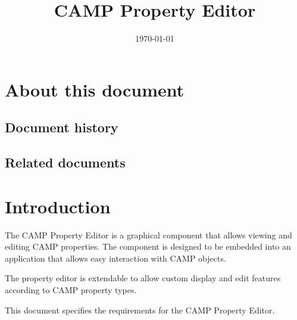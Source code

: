\documentclass[a4paper, twoside]{report}
\title{CAMP Property Editor}
\date{\today}
\begin{document}
\maketitle

\chapter*{About this document}

\section*{Document history}

\begin{historytable}
\end{historytable}

\section*{Related documents}

\begin{documenttable}
\end{documenttable}

\tableofcontents


\chapter{Introduction\label{sec:introduction}}

The CAMP Property Editor is a graphical component that allows viewing and editing CAMP properties. The
component is designed to be embedded into an application that allows easy interaction with CAMP
objects.

The property editor is extendable to allow custom display and edit features according to CAMP property
types.

This document specifies the requirements for the CAMP Property Editor.
\end{document}
